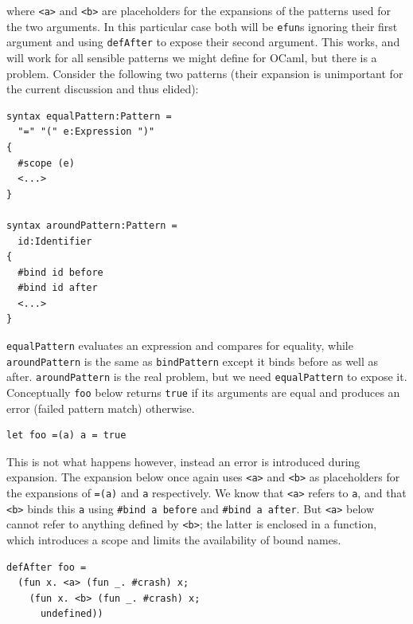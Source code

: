 \documentclass{kththesis}
\begin{document}
where \texttt{<a>} and \texttt{<b>} are placeholders for the expansions of the patterns used for the two arguments. In this particular case both will be \texttt{efun}s ignoring their first argument and using \texttt{defAfter} to expose their second argument. This works, and will work for all sensible patterns we might define for OCaml, but there is a problem. Consider the following two patterns (their expansion is unimportant for the current discussion and thus elided):

\begin{verbatim}
syntax equalPattern:Pattern =
  "=" "(" e:Expression ")"
{
  #scope (e)
  <...>
}

syntax aroundPattern:Pattern =
  id:Identifier
{
  #bind id before
  #bind id after
  <...>
}
\end{verbatim}

\texttt{equalPattern} evaluates an expression and compares for equality, while \texttt{aroundPattern} is the same as \texttt{bindPattern} except it binds before as well as after. \texttt{aroundPattern} is the real problem, but we need \texttt{equalPattern} to expose it. Conceptually \texttt{foo} below returns \texttt{true} if its arguments are equal and produces an error (failed pattern match) otherwise.

\begin{verbatim}
let foo =(a) a = true
\end{verbatim}

This is not what happens however, instead an error is introduced during expansion. The expansion below once again uses \texttt{<a>} and \texttt{<b>} as placeholders for the expansions of \texttt{=(a)} and \texttt{a} respectively. We know that \texttt{<a>} refers to \texttt{a}, and that \texttt{<b>} binds this \texttt{a} using \texttt{#bind a before} and \texttt{#bind a after}. But \texttt{<a>} below cannot refer to anything defined by \texttt{<b>}; the latter is enclosed in a function, which introduces a scope and limits the availability of bound names.

\begin{verbatim}
defAfter foo =
  (fun x. <a> (fun _. #crash) x;
    (fun x. <b> (fun _. #crash) x;
      undefined))
\end{verbatim}
\end{document}
